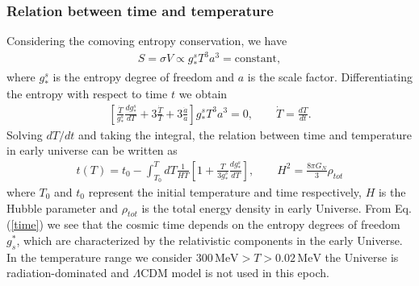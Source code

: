 \subsubsection{Relation between time and temperature}
Considering the comoving entropy conservation, we have
\begin{align}
S=\sigma V\propto g^s_\ast T^3a^3=\mathrm{constant},
\end{align}
where $g^s_\ast$ is the entropy degree of freedom and $a$ is the scale factor. Differentiating the entropy with respect to time $t$ we obtain
\begin{align}
\left[\frac{\dot{T}}{g^s_\ast}\frac{dg^s_\ast}{dT}+3\frac{\dot{T}}{T}+3\frac{\dot{a}}{a}\right]g^s_\ast T^3a^3=0,\qquad \dot{T}=\frac{dT}{dt}.
\end{align}
Solving $dT/dt$ and taking the integral, the relation between time and temperature in early universe can be written as
\begin{align}\label{time}
t(T)=t_0-\int^T_{T_0}dT\frac{1}{HT}\left[1+\frac{T}{3g^s_\ast}\frac{dg^s_\ast}{dT}\right],\qquad H^2=\frac{8\pi G_N}{3}\rho_{tot}
\end{align}
where $T_0$ and $t_0$ represent the initial temperature and time respectively, $H$ is the Hubble parameter and $\rho_{tot}$ is the total energy density in early Universe. From Eq. (\ref{time}) we see that the cosmic time depends on the entropy degrees of freedom $g^\ast_s$, which are characterized by the relativistic components in the early Universe. In the temperature range we consider $300\,\mathrm{MeV}>T>0.02\,\mathrm{MeV}$ the Universe is radiation-dominated and $\Lambda$CDM model is not used in this epoch.


